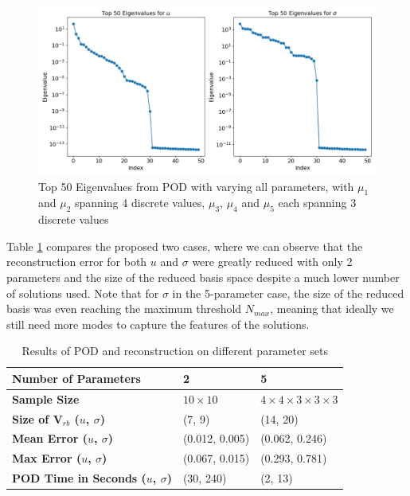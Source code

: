 \begin{figure}[!h]
    \centering
    \includegraphics[width=0.8\linewidth]{fig_pod/eigendecay_4,4,3,3,3.png}
    \caption{Top 50 Eigenvalues from POD with varying all parameters, with $\mu_1$ and $\mu_2$ spanning 4 discrete values, $\mu_3$, $\mu_4$ and $\mu_5$ each spanning 3 discrete values}
    \label{fig:eigendecay_allvary}
\end{figure}

 Table \ref{tab:POD_results} compares the proposed two cases, where we can observe that the reconstruction error for both $u$ and $\sigma$  were greatly reduced with only 2 parameters and the size of the reduced basis space despite a much lower number of solutions used. Note that for $\sigma$ in the 5-parameter case, the size of the reduced basis was even reaching the maximum threshold $N_{max}$, meaning that ideally we still need more modes to capture the features of the solutions. 

\begin{table}[htb]
    \centering
    \caption{Results of POD and reconstruction on different parameter sets}
    \begin{tabular}{l|l|l}
        \toprule
        \textbf{Number of Parameters} & 2 & 5 \\
        \midrule
        \textbf{Sample Size} & $10 \times 10$ & $4 \times 4 \times 3 \times 3 \times 3$\\
        \textbf{Size of $\mathbf{V}_{rb}$ ($u$, $\sigma$)} & (7, 9)  & (14, 20) \\
        \textbf{Mean Error ($u$, $\sigma$)} & (0.012, 0.005) & (0.062, 0.246) \\
        \textbf{Max Error ($u$, $\sigma$)} & (0.067, 0.015) & (0.293, 0.781) \\
        \textbf{POD Time in Seconds ($u$, $\sigma$)} & (30, 240) & (2, 13) \\
        \bottomrule
    \end{tabular}
    \label{tab:POD_results}
\end{table}

